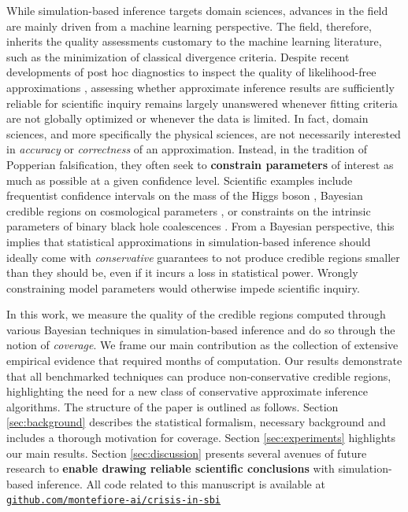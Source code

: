 \documentclass[twoside]{article}
\begin{document}
While simulation-based inference targets domain sciences, advances in the field are mainly driven from a machine learning perspective.
The field, therefore, inherits the quality assessments \citep{lueckmann2021benchmarking} customary to the machine learning literature, such as the minimization of classical divergence criteria.
Despite recent developments of post hoc diagnostics to inspect the quality of likelihood-free approximations \citep{cranmer2015approximating, Brehmer:2018eca, brehmer2019mining, Hermans:2020skz, lueckmann2021benchmarking, sbc, dalmasso2020confidence}, assessing whether approximate inference results are sufficiently reliable for scientific inquiry remains largely unanswered whenever fitting criteria are not globally optimized or whenever the data is limited.
In fact, domain sciences, and more specifically the physical sciences, are not necessarily interested in \emph{accuracy} or \emph{correctness} of an approximation.
Instead, in the tradition of Popperian falsification, they often seek to {\bfseries constrain parameters} of interest as much as possible at a given confidence level.
Scientific examples include frequentist confidence intervals on the mass of the Higgs boson \citep{aad2012observation}, Bayesian credible regions on cosmological parameters \citep{gilman2018probing,Planck:2018vyg}, or constraints on the intrinsic parameters of binary black hole coalescences \citep{abbott2016gw151226}.
From a Bayesian perspective, this implies that statistical approximations in simulation-based inference should ideally come with \emph{conservative} guarantees to not produce credible regions smaller than they should be, even if it incurs a loss in statistical power.
Wrongly constraining model parameters would otherwise impede scientific inquiry.

In this work, we measure the quality of the credible regions computed through various Bayesian techniques in simulation-based inference and do so through the notion of \emph{coverage}.
We frame our main contribution as the collection of extensive empirical evidence that required months of computation.
Our results demonstrate that all benchmarked techniques can produce non-conservative credible regions, highlighting the need for a new class of conservative approximate inference algorithms.
The structure of the paper is outlined as follows.
Section \ref{sec:background} describes the statistical formalism, necessary background and includes a thorough motivation for coverage.
Section \ref{sec:experiments} highlights our main results.
Section \ref{sec:discussion} presents several avenues of future research to {\bfseries enable drawing reliable scientific conclusions} with simulation-based inference. All code related to this manuscript is available at
\href{https://github.com/montefiore-ai/crisis-in-sbi}{\texttt{github.com/montefiore-ai/crisis-in-sbi}}
\end{document}
